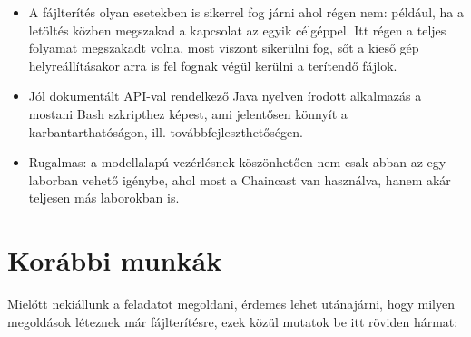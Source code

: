 \begin{itemize}
  \item A fájlterítés olyan esetekben is sikerrel fog járni ahol régen nem: például, ha a letöltés közben megszakad a kapcsolat az egyik célgéppel. Itt régen a teljes folyamat megszakadt volna, most viszont sikerülni fog, sőt a kieső gép helyreállításakor arra is fel fognak végül kerülni a terítendő fájlok.
  \item Jól dokumentált API-val rendelkező Java nyelven írodott alkalmazás a mostani Bash szkripthez képest, ami jelentősen könnyít a karbantarthatóságon, ill. továbbfejleszthetőségen.
  \item Rugalmas: a modellalapú vezérlésnek köszönhetően nem csak abban az egy laborban vehető igénybe, ahol most a Chaincast van használva, hanem akár teljesen más laborokban is.
\end{itemize}

\section{Korábbi munkák}
Mielőtt nekiállunk a feladatot megoldani, érdemes lehet utánajárni, hogy milyen megoldások léteznek már fájlterítésre, ezek közül mutatok be itt röviden hármat:

